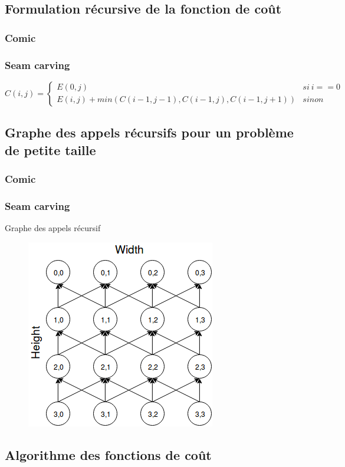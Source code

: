 \documentclass[10pt]{article}
\begin{document}
\subsection{Formulation récursive de la fonction de coût}
\subsubsection{Comic}
\subsubsection{Seam carving}
$$
C(i,j) = \left\{
	\begin{array}{ll}
		E(0,j) & si\ i==0 \\
		E(i,j)+min(C(i-1,j-1),C(i-1,j),C(i-1,j+1)) & sinon
	\end{array}
\right.
$$

\subsection{Graphe des appels récursifs pour un problème de petite taille}
\subsubsection{Comic}
\subsubsection{Seam carving}
Graphe des appels récursif
 \begin{figure} [h]
      \centering
      \includegraphics[scale=0.5]{GrapheSeamCarving.png}
   \end{figure}

\subsection{Algorithme des fonctions de coût}
\end{document}
